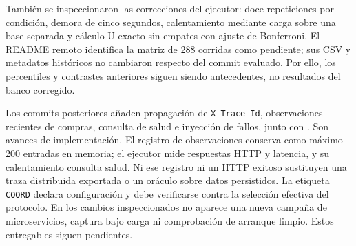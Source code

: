 También se inspeccionaron las correcciones del ejecutor: doce repeticiones por condición, demora de cinco segundos, calentamiento mediante carga sobre una base separada y cálculo U exacto sin empates con ajuste de Bonferroni. El README remoto identifica la matriz de 288 corridas como pendiente; sus CSV y metadatos históricos no cambiaron respecto del commit evaluado. Por ello, los percentiles y contrastes anteriores siguen siendo antecedentes, no resultados del banco corregido.

Los commits posteriores añaden propagación de \texttt{X-Trace-Id}, observaciones recientes de compras, consulta de salud e inyección de fallos, junto con . Son avances de implementación. El registro de observaciones conserva como máximo 200 entradas en memoria; el ejecutor mide respuestas HTTP y latencia, y su calentamiento consulta salud. Ni ese registro ni un HTTP exitoso sustituyen una traza distribuida exportada o un oráculo sobre datos persistidos. La etiqueta \texttt{COORD} declara configuración y debe verificarse contra la selección efectiva del protocolo. En los cambios inspeccionados no aparece una nueva campaña de microservicios, captura bajo carga ni comprobación de arranque limpio. Estos entregables siguen pendientes.
